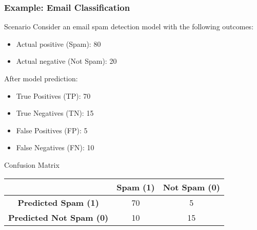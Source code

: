 \documentclass{beamer}
\begin{document}
\begin{frame}[fragile]
    \frametitle{Example: Email Classification}
    \begin{block}{Scenario}
        Consider an email spam detection model with the following outcomes:
        \begin{itemize}
            \item Actual positive (Spam): 80
            \item Actual negative (Not Spam): 20
        \end{itemize}
        
        After model prediction:
        \begin{itemize}
            \item True Positives (TP): 70
            \item True Negatives (TN): 15
            \item False Positives (FP): 5
            \item False Negatives (FN): 10
        \end{itemize}
    \end{block}

    \begin{block}{Confusion Matrix}
        \begin{center}
        \begin{tabular}{|c|c|c|}
            \hline
            & \textbf{Spam (1)} & \textbf{Not Spam (0)} \\
            \hline
            \textbf{Predicted Spam (1)} & 70 & 5 \\
            \hline
            \textbf{Predicted Not Spam (0)} & 10 & 15 \\
            \hline
        \end{tabular}
        \end{center}
    \end{block}
\end{frame}
\end{document}

